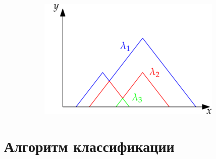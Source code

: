\documentclass{beamer}
\begin{document}
\begin{frame}
\begin{figure}[!htbp]
\begin{subfigure}{0.23\textwidth}
				\end{subfigure}\hfil %
				\begin{subfigure}{0.35\textwidth}
					\includegraphics[width=\linewidth]{persistent_landscape.png}
				\end{subfigure}
			\end{figure}
		\end{frame}
	\section{Алгоритм классификации}
\end{document}
